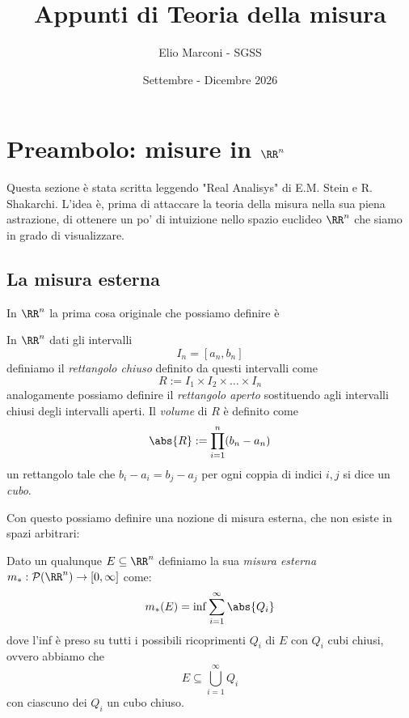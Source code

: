 \documentclass[11pt]{scrartcl}
\newcommand{\parti}[1]{\mathcal{P}\!\left(#1\right)}
\begin{document}
	\title{Appunti di Teoria della misura}
	\subtitle{Elio Marconi - SGSS}
	\date{Settembre - Dicembre 2026}
	
	
	\maketitle
	
	\tableofcontents
	
	\newpage
	
	\section{Preambolo: misure in $\RR^n$}
	
	Questa sezione è stata scritta leggendo "Real Analisys" di E.M. Stein e R. Shakarchi. L'idea è, prima di attaccare la teoria della misura nella sua piena astrazione, di ottenere un po' di intuizione nello spazio euclideo $\RR^n$ che siamo in grado di visualizzare. 
	
	\subsection{La misura esterna}
	
	In $\RR^n$ la prima cosa originale che possiamo definire è 
	\begin{definition}
		In $\RR^n$ dati gli intervalli
		$$I_n=\left[a_n,b_n\right]$$
		definiamo il \textit{rettangolo chiuso} definito da questi intervalli come
		$$R:= I_1\times I_2 \times \dots \times I_n$$
		analogamente possiamo definire il \textit{rettangolo aperto} sostituendo agli intervalli chiusi degli intervalli aperti. Il \textit{volume} di $R$ è definito come
		$$\abs{R}:= \prod_{i=1}^{n}(b_n-a_n)$$
		un rettangolo tale che $b_i-a_i=b_j-a_j$ per ogni coppia di indici $i,j$ si dice un \textit{cubo}.
	\end{definition}  
	Con questo possiamo definire una nozione di misura esterna, che non esiste in spazi arbitrari:
	\begin{definition}
		Dato un qualunque $E\subseteq\RR^n$ definiamo la sua \textit{misura esterna} $m_*:\parti{\RR^n}\to [0,\infty]$ come:
		$$m_*(E)=\inf\sum_{i=1}^{\infty}\abs{Q_i}$$
		dove l'inf è preso su tutti i possibili ricoprimenti $Q_i$ di $E$ con $Q_i$ cubi chiusi, ovvero abbiamo che 
		$$E\subseteq \bigcup_{i=1}^\infty Q_i$$
		con ciascuno dei $Q_i$ un cubo chiuso.
	\end{definition}
	
	
\end{document}

